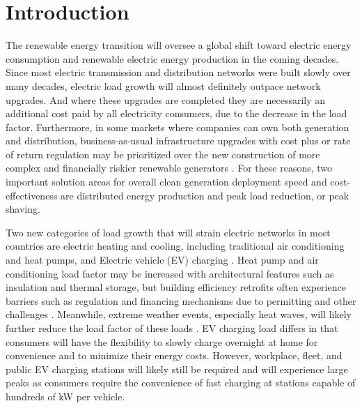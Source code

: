 \documentclass[journal,article,submit,pdftex,moreauthors]{Definitions/mdpi}
\begin{document}
\section{Introduction}\label{introduction}


The renewable energy transition will oversee a global shift toward electric energy consumption and renewable electric energy production in the coming decades. Since most electric transmission and distribution networks were built slowly over many decades, electric load growth will almost definitely outpace network upgrades. And where these upgrades are completed they are necessarily an additional cost paid by all electricity consumers, due to the decrease in the load factor. Furthermore, in some markets where companies can own both generation and distribution, business-as-usual infrastructure upgrades with cost plus or rate of return regulation may be prioritized over the new construction of more complex and financially riskier renewable generators \cite{Wagner2019}. For these reasons, two important solution areas for overall clean generation deployment speed and cost-effectiveness are distributed energy production and peak load reduction, or peak shaving.

Two new categories of load growth that will strain electric networks in most countries are electric heating and cooling, including traditional air conditioning and heat pumps, and Electric vehicle (EV) charging \cite{Bobmann2015}. Heat pump and air conditioning load factor may be increased with architectural features such as insulation and thermal storage, but building efficiency retrofits often experience barriers such as regulation and financing mechanisms due to permitting and other challenges \cite{Bertone2016}. Meanwhile, extreme weather events, especially heat waves, will likely further reduce the load factor of these loads \cite{Villa2022}. EV charging load differs in that consumers will have the flexibility to slowly charge overnight at home for convenience and to minimize their energy costs. However, workplace, fleet, and public EV charging stations will likely still be required and will experience large peaks as consumers require the convenience of fast charging at stations capable of hundreds of kW per vehicle.

\end{document}
